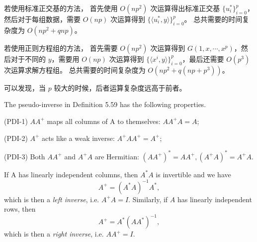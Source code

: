 \documentclass[lang=cn,a4paper,newtx,bibend=bibtex]{elegantpaper}
\newcommand{\indot}[2]{\langle {#1}, {#2} \rangle}
\begin{document}
\begin{solution}
\begin{enumerate}
若使用标准正交基的方法，
首先使用 $O(np^2)$ 次运算得出标准正交基 $\{u_i^*\}_{i = 0}^{p}$，然后对于每组数据，需要 $O(np)$ 次运算得到 $\{\indot{u_i^*}{y}\}_{i = 0}^{p}$。
总共需要的时间复杂度为 $O(np^2 + qnp)$。

若使用正则方程组的方法，
首先需要 $O(np^2)$ 次运算得到 $G(1, x, \cdots, x^p)$，然后对于不同的 $y$，需要用 $O(np)$ 次运算得到 $\{\indot{x^i}{y}\}_{i = 0}^p$，最后还需要 $O(p^3)$ 次运算求解方程组。
总共需要的时间复杂度为 $O(np^2 + q(np + p^3))$。

可以发现，当 $p$ 较大的时候，后者运算复杂度远高于前者。 

\end{enumerate}
\end{solution}

\begin{prob}
  The pseudo-inverse in Definition 5.59 has the following properties.

    (PDI-1) $AA^+$ maps all columns of A to themselves: $AA^+A = A$;
    
    (PDI-2) $A^+$ acts like a weak inverse: $A^+AA^+ = A^+$;
    
    (PDI-3) Both $AA^+$ and $A^+A$ are Hermitian: $(AA^+)^* = AA^+, (A^+A)^* = A^+A.$


  If A has linearly independent columns, then $A^*A$ is invertible and we have
  \[A^+ = (A^*A)^{-1}A^*,\]
  which is then a \textit{left inverse}, i.e. $A^+A = I$. Similarly, if $A$
  has linearly independent rows, then \[A^+ = A^*(AA^*)^{-1},\] which is then a 
  \textit{right inverse}, i.e. $AA^+ = I$.
\end{prob}
\end{document}
